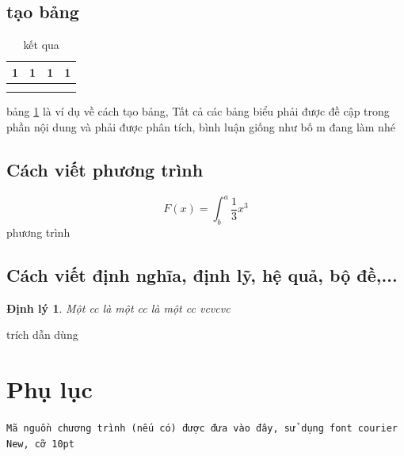\documentclass{article}
\newtheorem{theorem}{Định lý}[section]
\begin{document}
\subsection{tạo bảng}
\begin{table}[H]
    \centering
     \caption{kết qua}
    \begin{tabular}{|c|c|c|c|}
    \hline
      1  &  1& 1 &1 \\\hline
        &  &  &\\\hline
        &  &  &\\\hline
      
    \end{tabular}
   
    \label{vailonluon}
\end{table}
bảng \ref{vailonluon} là ví dụ về cách tạo bảng, Tất cả các bảng biểu phải được đề cập trong phần nội dung và phải được phân tích, bình luận giống như bố m đang làm nhé

\subsection{Cách viết phương trình}
\begin{equation} \label{pt31}
    F(x) = \int^a_b \frac{1}{3}x^3
\end{equation}
phương trình

\subsection{Cách viết định nghĩa, định lỹ, hệ quả, bộ đề,...}
\begin{theorem}
    Một cc là một cc là một cc vcvcvc
\end{theorem}
\cleardoublepage

\cleardoublepage
{}


trích dẫn dùng \cite{floyd2013electronics}

\cleardoublepage
\section*{Phụ lục}
\texttt{\fontsize{10pt}{0pt}\selectfont Mã nguồn chương trình (nếu có) được đưa vào đây, sử dụng font courier New, cỡ 10pt }
\end{document}
